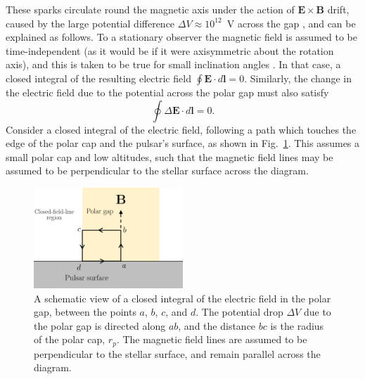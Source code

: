 These sparks circulate round the magnetic axis under the action of $\mathbf{E} \times \mathbf{B}$ drift, caused by the large potential difference $\Delta V \approx 10^{12}$~V across the gap \citep{RSxx1975}, and can be explained as follows. To a stationary observer the magnetic field is assumed to be time-independent (as it would be if it were axisymmetric about the rotation axis), and this is taken to be true for small inclination angles \citep{RSxx1975}. In that case, a closed integral of the resulting electric field $\oint \mathbf{E}\cdot d \mathbf{l} = 0$. Similarly, the change in the electric field due to the potential across the polar gap must also satisfy
\begin{equation}
    \label{eq: intro - zero E field circulation}
    \oint \Delta\mathbf{E}\cdot d \mathbf{l} = 0.
\end{equation}
Consider a closed integral of the electric field, following a path which touches the edge of the polar cap and the pulsar's surface, as shown in Fig.~\ref{fig: intro - polar gap integral}. This assumes a small polar cap and low altitudes, such that the magnetic field lines may be assumed to be perpendicular to the stellar surface across the diagram.
\begin{figure}
	\centering
	\includegraphics[width=0.5\textwidth]{Figures/Introduction/polar_gap_integral}
    \caption[Closed integral of the electric field in the polar gap]{A schematic view of a closed integral of the electric field in the polar gap, between the points $a$, $b$, $c$, and $d$. The potential drop $\Delta V$ due to the polar gap is directed along $ab$, and the distance $bc$ is the radius of the polar cap, $r_p$. The magnetic field lines are assumed to be perpendicular to the stellar surface, and remain parallel across the diagram.}
    \label{fig: intro - polar gap integral} 
\end{figure}

